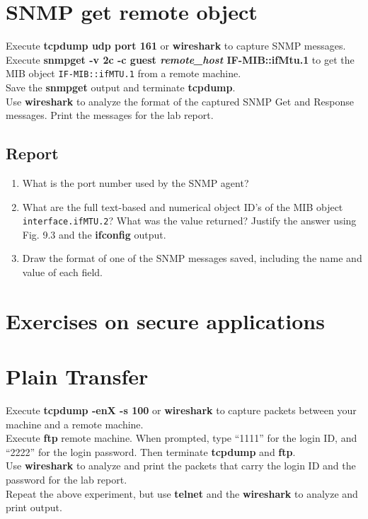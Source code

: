 \documentclass[10pt,a4paper]{article}
\numberwithin{equation}{section}
\numberwithin{figure}{section}
\numberwithin{table}{section}
\begin{document}
\section{SNMP get remote object}
	Execute \textbf{tcpdump udp port 161} or \textbf{wireshark} to capture SNMP messages.\\
	Execute \textbf{snmpget -v 2c -c guest \textit{remote\_host} IF-MIB::ifMtu.1} to get the MIB object \texttt{IF-MIB::ifMTU.1} from a remote machine.\\
	Save the \textbf{snmpget} output and terminate \textbf{tcpdump}.\\
	Use \textbf{wireshark} to analyze the format of the captured SNMP Get and Response messages. Print the messages for the lab report.
	
	\subsection*{Report}
	\begin{enumerate}
		\item What is the port number used by the SNMP agent?
		\item What are the full text-based and numerical object ID’s of the MIB object \texttt{interface.ifMTU.2}? What was the value returned? Justify the answer using Fig. 9.3 and the \textbf{ifconfig} output.
		\item Draw the format of one of the SNMP messages saved, including the name and value of each field.
	\end{enumerate}

\section*{Exercises on secure applications}
	
\section{Plain Transfer}
	Execute \textbf{tcpdump -enX -s 100} or \textbf{wireshark} to capture packets between your machine and a remote machine.\\
	Execute \textbf{ftp} remote machine. When prompted, type “1111” for the login ID, and “2222” for the login password. Then terminate \textbf{tcpdump} and \textbf{ftp}.\\
	Use \textbf{wireshark} to analyze and print the packets that carry the login ID and the password for the lab report.\\
	Repeat the above experiment, but use \textbf{telnet} and the \textbf{wireshark} to analyze and print output.
\end{document}

